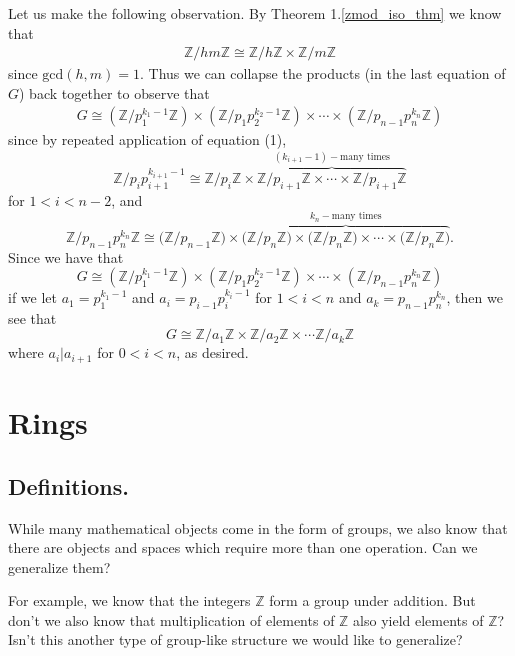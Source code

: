 \documentclass[12pt,letterpaper]{algebra_book}
\newcommand{\ZZ}{\mathbb{Z}}
\theoremstyle{definition}
\begin{document}
\begin{prf}
    Let us make the following observation. By Theorem
    1.\ref{zmod_iso_thm} we know that 
    \setcounter{equation}{0}
    \begin{align}
        \ZZ/hm\ZZ \cong \ZZ/h\ZZ \times \ZZ/m\ZZ       
    \end{align}
    since $\mbox{gcd}(h, m) = 1$.
    Thus we can collapse the products (in the last equation of $G$) 
    back together to observe that 
    \begin{align*}
        G \cong (\ZZ/p_1^{k_1 - 1}\ZZ)
        \times (\ZZ/p_1p_2^{k_2-1}\ZZ) \times \cdots
        \times (\ZZ/p_{n-1}p_n^{k_n}\ZZ)
    \end{align*}
    since by repeated application of equation (1), 
    \[
        \ZZ/p_ip_{i+1}^{k_{i+1} - 1} \cong \ZZ/p_i\ZZ\times \overbrace{\ZZ/p_{i + 1}\ZZ \times \cdots \times \ZZ/p_{i + 1}\ZZ}^\text{$(k_{i+1} - 1)-$many times}        
    \]
    for $1 < i < n -2$, and 
    \[
        \ZZ/p_{n-1}p_n^{k_n}\ZZ \cong \textbf{(}\ZZ/p_{n-1}\ZZ\textbf{)} \times
    \overbrace{\textbf{(}\mathbb{Z}/p_n\mathbb{Z\textbf{)}} \times \textbf{(}\mathbb{Z}/p_n\mathbb{Z}\textbf{)} \times \cdots \times \textbf{(}\mathbb{Z}/p_n\mathbb{Z}\textbf{)}}^\text{$k_n-$many times}.
    \]
    Since we have that 
    \[
        G \cong (\ZZ/p_1^{k_1 - 1}\ZZ)
        \times (\ZZ/p_1p_2^{k_2-1}\ZZ) \times \cdots
        \times (\ZZ/p_{n-1}p_n^{k_n}\ZZ)
    \]
    if we let $a_1 = p_1^{k_1 - 1}$ and 
    $a_i = p_{i-1}p_{i}^{k_{i} - 1}$ for $1 < i < n$ and $a_k =
    p_{n-1}p_n^{k_n}$, then we see that 
    \[
      G \cong  \mathbb{Z}/a_1\mathbb{Z} \times \mathbb{Z}/a_2\mathbb{Z} \times \cdots \mathbb{Z} / a_k \mathbb{Z} 
    \]
    where $a_i \big| a_{i + 1}$ for $0 < i < n$, as desired.
    \end{prf}

    
    \chapter{Rings}
\section{Definitions.}

While many mathematical objects come in the form of groups, we
also know that there are objects and spaces which require more
than one operation. Can we generalize them?

For example, we know that the integers $\mathbb{Z}$ form a group
under addition. But don't we also know that multiplication of
elements of $\mathbb{Z}$ also yield elements of $\mathbb{Z}$?
Isn't this another type of group-like structure we would like to
generalize?
\end{document}
